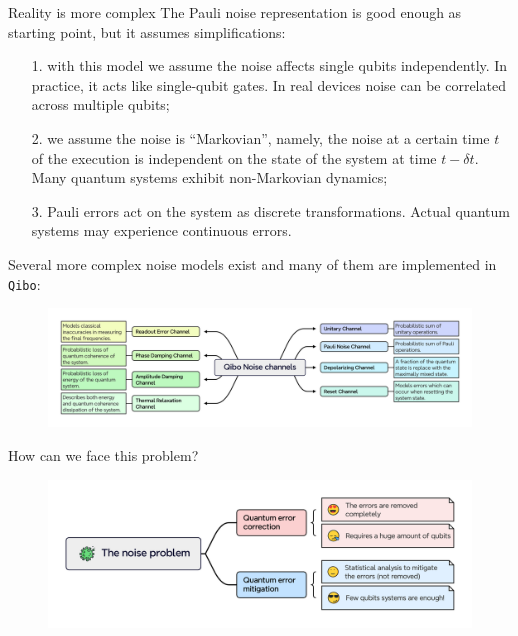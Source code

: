 \documentclass[aspectratio=169, 8pt, xcolor={svgnames}, hyperref={linkcolor=black}]{beamer}
\begin{document}
\begin{frame}{Reality is more complex}
The Pauli noise representation is good enough as starting point, but it assumes simplifications: \pause
\begin{itemize}[noitemsep]
\item[1.] with this model we assume the noise affects single qubits independently. In practice, it 
acts like single-qubit gates. \textcolor{carnelian}{In real devices noise can be 
correlated across multiple qubits}; \pause
\item[2.] we assume the noise is ``Markovian'', namely, the noise at a certain time $t$
of the execution is independent on the state of the system at time $t-\delta t$. 
\textcolor{carnelian}{Many quantum systems exhibit non-Markovian dynamics}; \pause
\item[3.] Pauli errors act on the system as discrete transformations. 
\textcolor{carnelian}{Actual quantum systems may experience continuous errors}. \pause
\end{itemize}
Several more complex noise models exist and many of them are implemented in \texttt{Qibo}: \pause
\begin{figure}
    \includegraphics[width=1\textwidth]{figures/qibo_noise_channels.png}
\end{figure}
\end{frame}

\begin{frame}{How can we face this problem?}
\begin{figure}
    \includegraphics[width=1\textwidth]{figures/qem_qec.pdf}
\end{figure}
\end{frame}
\end{document}
